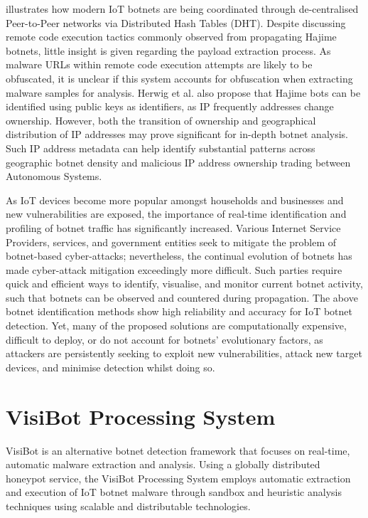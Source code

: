 \citet{Herwig2019} illustrates how modern IoT botnets are being coordinated through de-centralised Peer-to-Peer networks via Distributed Hash Tables (DHT). Despite discussing remote code execution tactics commonly observed from propagating Hajime botnets, little insight is given regarding the payload extraction process. As malware URLs within remote code execution attempts are likely to be obfuscated, it is unclear if this system accounts for obfuscation when extracting malware samples for analysis. Herwig et al. also propose that Hajime bots can be identified using public keys as identifiers, as IP frequently addresses change ownership. However, both the transition of ownership and geographical distribution of IP addresses may prove significant for in-depth botnet analysis. Such IP address metadata can help identify substantial patterns across geographic botnet density and malicious IP address ownership trading between Autonomous Systems. 

As IoT devices become more popular amongst households and businesses and new vulnerabilities are exposed, the importance of real-time identification and profiling of botnet traffic has significantly increased. Various Internet Service Providers, services, and government entities seek to mitigate the problem of botnet-based cyber-attacks; nevertheless, the continual evolution of botnets has made cyber-attack mitigation exceedingly more difficult. Such parties require quick and efficient ways to identify, visualise, and monitor current botnet activity, such that botnets can be observed and countered during propagation. The above botnet identification methods show high reliability and accuracy for IoT botnet detection. Yet, many of the proposed solutions are computationally expensive, difficult to deploy, or do not account for botnets' evolutionary factors, as attackers are persistently seeking to exploit new vulnerabilities, attack new target devices, and minimise detection whilst doing so. 

\section{VisiBot Processing System}

VisiBot is an alternative botnet detection framework that focuses on real-time, automatic malware extraction and analysis. Using a globally distributed honeypot service, the VisiBot Processing System employs automatic extraction and execution of IoT botnet malware through sandbox and heuristic analysis techniques using scalable and distributable technologies. 

